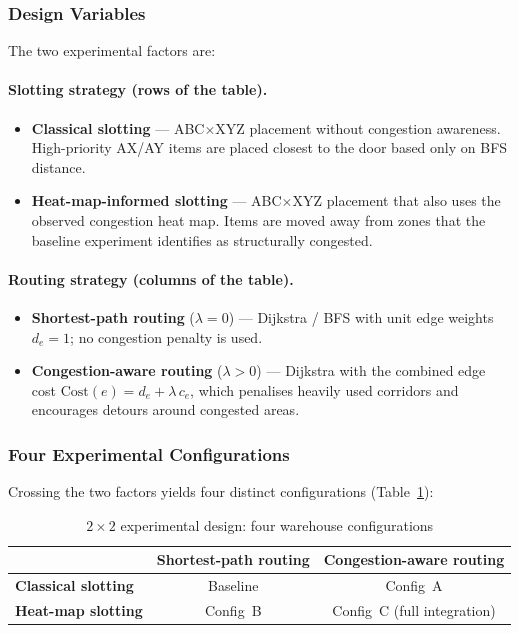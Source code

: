 \documentclass[12pt,a4paper]{article}
\begin{document}
\subsubsection{Design Variables}

The two experimental factors are:

\paragraph{Slotting strategy (rows of the table).}
\begin{itemize}
  \item \textbf{Classical slotting} --- ABC$\times$XYZ placement without congestion
    awareness. High-priority AX/AY items are placed closest to the door based only
    on BFS distance.
  \item \textbf{Heat-map-informed slotting} --- ABC$\times$XYZ placement that also
    uses the observed congestion heat map. Items are moved away from zones that the
    baseline experiment identifies as structurally congested.
\end{itemize}

\paragraph{Routing strategy (columns of the table).}
\begin{itemize}
  \item \textbf{Shortest-path routing} ($\lambda = 0$) --- Dijkstra / BFS with unit
    edge weights $d_e = 1$; no congestion penalty is used.
  \item \textbf{Congestion-aware routing} ($\lambda > 0$) --- Dijkstra with the
    combined edge cost $\mathrm{Cost}(e) = d_e + \lambda\,c_e$, which penalises
    heavily used corridors and encourages detours around congested areas.
\end{itemize}

\subsubsection{Four Experimental Configurations}

Crossing the two factors yields four distinct configurations (Table~\ref{tab:2x2}):

\begin{table}[h]
\centering
\caption{$2 \times 2$ experimental design: four warehouse configurations}
\label{tab:2x2}
\begin{tabular}{lcc}
\hline
 & \textbf{Shortest-path routing} & \textbf{Congestion-aware routing} \\
\hline
\textbf{Classical slotting}   & Baseline & Config~A \\
\textbf{Heat-map slotting}    & Config~B & Config~C (full integration) \\
\hline
\end{tabular}
\end{table}
\end{document}
